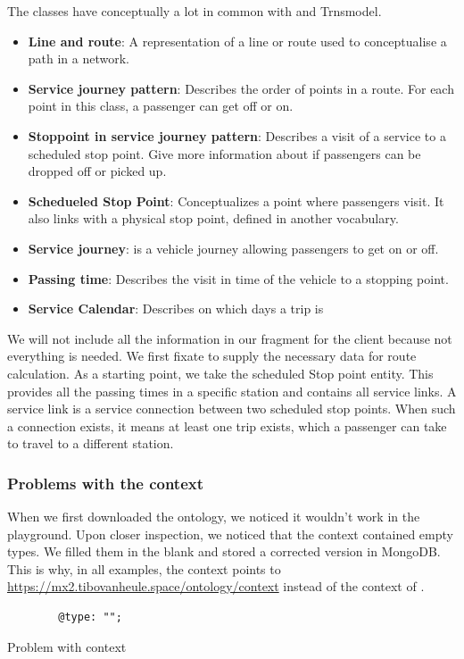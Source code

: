 The classes have conceptually a lot in common with  and Trnsmodel. 
\begin{itemize}
    \item \textbf{Line and route}: A representation of a line or route used to conceptualise a path in a network.
    \item \textbf{Service journey pattern}: Describes the order of points in a route. For each point in this class, a passenger can get off or on.
    \item \textbf{Stoppoint in service journey pattern}: Describes a visit of a service to a scheduled stop point. Give more information about if passengers can be dropped off or picked up.
    \item \textbf{Schedueled Stop Point}: Conceptualizes a point where passengers visit. It also links with a physical stop point, defined in another vocabulary.
    \item \textbf{Service journey}: is a vehicle journey allowing passengers to get on or off.
    \item \textbf{Passing time}: Describes the visit in time of the vehicle to a stopping point.
    \item \textbf{Service Calendar}: Describes on which days a trip is 
\end{itemize}

We will not include all the information in our fragment for the client because not everything is needed. We first fixate to supply the necessary data for route calculation. As a starting point, we take the scheduled Stop point entity. This provides all the passing times in a specific station and contains all service links. A service link is a service connection between two scheduled stop points. When such a connection exists, it means at least one trip exists, which a passenger can take to travel to a different station.



\subsubsection{Problems with the   context}
When we first downloaded the ontology, we noticed it wouldn't work in the  playground. Upon closer inspection, we noticed that the context contained empty types. We filled them in the blank and stored a corrected version in MongoDB. This is why, in all examples, the context points to \url{https://mx2.tibovanheule.space/ontology/context} instead of the context of .
\begin{listing}[H]
    \begin{verbatim}
        @type: "";
    \end{verbatim}
    \caption{Problem with  context}
    \label{code:context:problem}
\end{listing}

